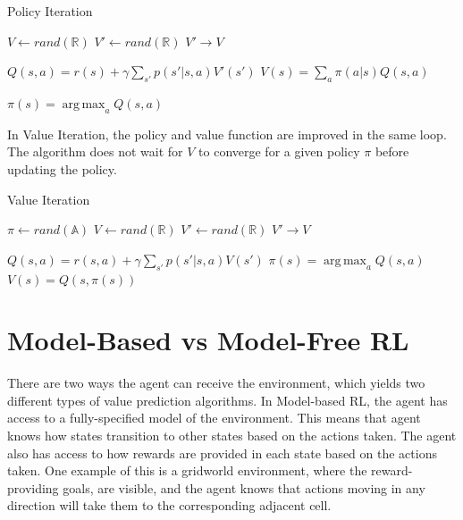 \documentclass[11pt]{article}
\DeclareMathOperator*{\argmax}{arg\,max}
\def\RR{\mathbb{R}}
\def\AA{\mathbb{A}}
\begin{document}
\begin{algorithm}[H]
\caption{Policy Iteration}
\label{algo:PI}
\begin{algorithmic}[1]
\STATE $V \leftarrow rand(\RR)$ \hfill
\STATE $V' \leftarrow rand(\RR)$ \hfill
{} 
\STATE $V' \rightarrow V$ \hfill
{}

\STATE $Q(s,a) = r(s) + \gamma \sum_{s'} p(s'|s,a)V'(s')$ \hfill 
\STATE $V(s) = \sum_a \pi(a|s) Q(s,a)$  \hfill

\ENDFOR
\ENDWHILE


\STATE $\pi(s) = \argmax_a Q(s,a)$ \hfill

\ENDFOR


\end{algorithmic}
\end{algorithm}


In Value Iteration, the policy and value function are improved in the same loop. The algorithm does not wait for $V$ to converge for a given policy $\pi$ before updating the policy. 
\begin{algorithm}[H]
\caption{Value Iteration}
\label{algo:VI}
\begin{algorithmic}[1]
\STATE $\pi \leftarrow rand(\AA)$ \hfill
\STATE $V \leftarrow rand(\RR)$ \hfill
\STATE $V' \leftarrow rand(\RR)$ \hfill
{} 
\STATE $V' \rightarrow V$

\STATE $Q(s,a) = r(s, a) + \gamma \sum_{s'} p(s'|s,a)V(s')$ \hfill 
\STATE $\pi(s) = \argmax_a Q(s,a)$ \hfill
\STATE $V(s) = Q(s,\pi(s))$  \hfill

\ENDFOR
\ENDWHILE
\end{algorithmic}
\end{algorithm}


\section{Model-Based vs Model-Free RL}
There are two ways the agent can receive the environment, which yields two different types of value prediction algorithms. In Model-based RL, the agent has access to a fully-specified model of the environment. This means that agent knows how states transition to other states based on the actions taken. The agent also has access to how rewards are provided in each state based on the actions taken. One example of this is a gridworld environment, where the reward-providing goals, are visible, and the agent knows that actions moving in any direction will take them to the corresponding adjacent cell. 
\end{document}
